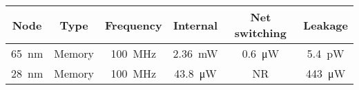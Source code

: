 \begin{table}[h]
\begin{minipage}{1\textwidth}
\begin{minipage}{0.65\textwidth}
\begin{adjustbox}{width=1\textwidth}
\begin{tabular}{ |c|c|c|c|c|c|  }
              \hline
            \end{tabular}
        \end{adjustbox}
      \label{tab:Scaling}
    \end{minipage}
    \begin{minipage}{0.65\textwidth}
        \vspace{5mm}
        \begin{adjustbox}{width=1\textwidth}
            \footnotesize
            \begin{tabular}{ |c|c|c|c|c|c|  }
              \hline
          Node  & Type      & Frequency                              & Internal                & Net switching           & Leakage                 \\
              \hline
          \SI{65}{\nano\meter}  & Memory    & \SI[per-mode=symbol]{100}{\mega\hertz}  & \SI{2.36}{\milli\watt}  & \SI{0.6}{\micro\watt}  & \SI{5.4}{\pico\watt}    \\   %
          \SI{28}{\nano\meter}  & Memory    & \SI[per-mode=symbol]{100}{\mega\hertz}  & \SI{43.8}{\micro\watt}  & NR                     & \SI{443}{\micro\watt}   \\   %
              \hline
            \end{tabular}
        \end{adjustbox}
      \label{tab:Example design with memory synthesis power}
    \end{minipage}

\end{minipage}
\end{table}
